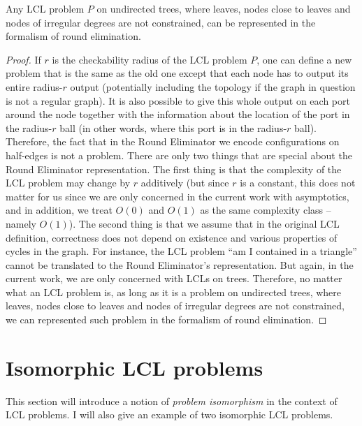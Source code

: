\begin{theorem}\label{theorem:re_formalism_is_general}
Any LCL problem $P$ on undirected trees, where
leaves, nodes close to leaves and nodes of irregular degrees are
not constrained, can be represented in the formalism of round elimination.
\end{theorem}
\begin{proof}
  If $r$ is the checkability radius of the LCL problem $P$,
  one can define a new problem that is the same as the old
  one except that each node has to output its entire radius-$r$
  output (potentially including the topology if the graph in
  question is not a regular graph). It is also possible to
  give this whole
  output on each port around the node together with
  the information about the location of the port in the
  radius-$r$ ball (in other words, where this port is in the radius-$r$
  ball). Therefore, the fact that in the Round Eliminator we encode configurations
  on half-edges is not a problem.
  There are only two things that are special about the Round Eliminator representation.
  The first thing is that the
  complexity of the LCL problem may change by $r$ additively
  (but since $r$ is a constant, this does not matter for us since we
  are only concerned in the current work with asymptotics, and in addition,
  we treat $O(0)$ and $O(1)$ as the same complexity class -- namely $O(1)$).
  The second thing is that
  we assume that in the original LCL definition,
  correctness does not depend on existence and various properties
  of cycles in the graph. For instance, the LCL problem ``am I contained in a
  triangle'' cannot be translated to the Round Eliminator's representation.
  But again, in the current work,
  we are only concerned with LCLs on trees.
  Therefore, no matter what an LCL problem is, as long as it is a problem on
  undirected trees, where
  leaves, nodes close to leaves and nodes of irregular degrees are
  not constrained, we can represented such problem in the formalism of
  round elimination.
\end{proof}

\section{Isomorphic LCL problems}

This section will introduce a notion of \emph{problem isomorphism}
in the context of LCL problems. I will also give an example
of two isomorphic LCL problems.

